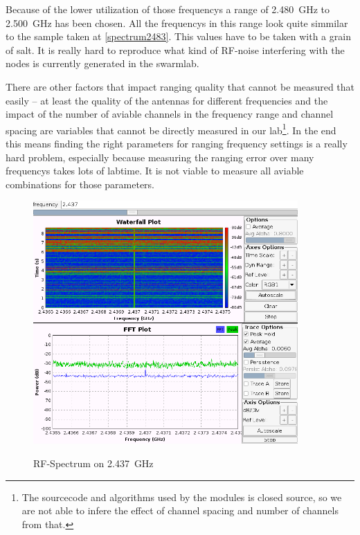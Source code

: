 Because of the lower utilization of those frequencys a range of \SI{2.480}{\giga\hertz} to \SI{2.500}{\giga\hertz} has been chosen.
All the frequencys in this range look quite simmilar to the sample taken at \autoref{spectrum2483}.
This values have to be taken with a grain of salt.
It is really hard to reproduce what kind of RF-noise interfering with the nodes is currently generated in the swarmlab.

There are other factors that impact ranging quality that cannot be measured that easily – at least the quality of the antennas for different frequencies and the impact of the number of aviable channels in the frequency range and channel spacing are variables that cannot be directly measured in our lab\footnote{The sourcecode and algorithms used by the modules is closed source, so we are not able to infere the effect of channel spacing and number of channels from that.}. 
In the end this means finding the right parameters for ranging frequency settings is a really hard problem, especially because measuring the ranging error over many frequencys takes lots of labtime. 
It is not viable to measure all aviable combinations for those parameters.


\begin{figure}[H]
	\centering
\includegraphics[width=0.9\textwidth]{figures/ch6.png}
\label{spectrum2437}
\caption{RF-Spectrum on \SI{2.437}{\giga\hertz}}
\end{figure}

